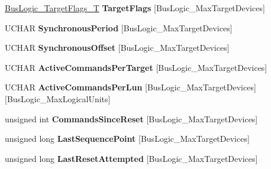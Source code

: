 \begin{DoxyCompactItemize}
\item 
\mbox{\label{struct_bus_logic___host_adapter_ae53513af9f21bb1c300e3cecdf88b1e5}} 
\hyperlink{struct_bus_logic___target_flags}{Bus\+Logic\+\_\+\+Target\+Flags\+\_\+T} {\bfseries Target\+Flags} \mbox{[}Bus\+Logic\+\_\+\+Max\+Target\+Devices\mbox{]}
\item 
\mbox{\label{struct_bus_logic___host_adapter_a54fa564ec4183c6a9a47bbe57f804a7e}} 
U\+C\+H\+AR {\bfseries Synchronous\+Period} \mbox{[}Bus\+Logic\+\_\+\+Max\+Target\+Devices\mbox{]}
\item 
\mbox{\label{struct_bus_logic___host_adapter_a91110ac68bd42132ccebc772fb999dd9}} 
U\+C\+H\+AR {\bfseries Synchronous\+Offset} \mbox{[}Bus\+Logic\+\_\+\+Max\+Target\+Devices\mbox{]}
\item 
\mbox{\label{struct_bus_logic___host_adapter_acd23f12677958a322929919036aafd30}} 
U\+C\+H\+AR {\bfseries Active\+Commands\+Per\+Target} \mbox{[}Bus\+Logic\+\_\+\+Max\+Target\+Devices\mbox{]}
\item 
\mbox{\label{struct_bus_logic___host_adapter_ab332a91c968c7049fdf0d03ff189bf43}} 
U\+C\+H\+AR {\bfseries Active\+Commands\+Per\+Lun} \mbox{[}Bus\+Logic\+\_\+\+Max\+Target\+Devices\mbox{]}\mbox{[}Bus\+Logic\+\_\+\+Max\+Logical\+Units\mbox{]}
\item 
\mbox{\label{struct_bus_logic___host_adapter_abe7372ae63b13b9b76594901de64a61f}} 
unsigned int {\bfseries Commands\+Since\+Reset} \mbox{[}Bus\+Logic\+\_\+\+Max\+Target\+Devices\mbox{]}
\item 
\mbox{\label{struct_bus_logic___host_adapter_afd3eac75fdc52a0ab784c549fd838631}} 
unsigned long {\bfseries Last\+Sequence\+Point} \mbox{[}Bus\+Logic\+\_\+\+Max\+Target\+Devices\mbox{]}
\item 
\mbox{\label{struct_bus_logic___host_adapter_a41a13ac83fa136ee09d5b4ce7efd04d4}} 
unsigned long {\bfseries Last\+Reset\+Attempted} \mbox{[}Bus\+Logic\+\_\+\+Max\+Target\+Devices\mbox{]}

\end{DoxyCompactItemize}
